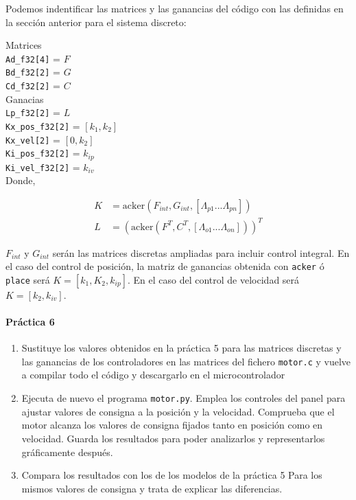 \documentclass[10pt,a4paper]{report}
\begin{document}
Podemos indentificar las matrices y las ganancias del código con las definidas en la sección anterior para el sistema discreto:

Matrices\\
\texttt{Ad\_f32[4]} = $F$\\
\texttt{Bd\_f32[2]} = $G$\\
\texttt{Cd\_f32[2]} = $C$\\

Ganacias\\
\texttt{Lp\_f32[2]} = $L$ \\
\texttt{Kx\_pos\_f32[2]} = $[k_1,k_2]$\\
\texttt{Kx\_vel[2]} = $[0,k_2]$\\
\texttt{Ki\_pos\_f32[2]} = $k_{ip}$\\
\texttt{Ki\_vel\_f32[2]} = $k_{iv}$\\

Donde,

\begin{align*}
K &= \text{acker}(F_{int},G_{int},[\Lambda_{p1}...\Lambda_{pn}])\\
L &= \left(\text{acker}(F^T,C^T,[\Lambda_{o1}...\Lambda_{on}])\right)^T
\end{align*}

$F_{int}$ y $G_{int}$ serán las matrices discretas ampliadas para incluir control integral. En el caso del control de posición, la matriz de ganancias obtenida con \texttt{acker} ó \texttt{place} será $K = [k_1,K_2,k_{ip}]$. En el caso del control de velocidad será $K = [k_2,k_{iv}]$.

\paragraph{Práctica 6}
\begin{enumerate}
\item  Sustituye los valores obtenidos en la práctica 5 para las matrices discretas y las ganancias de los controladores en las matrices del fichero \texttt{motor.c} y vuelve a compilar todo el código y descargarlo en el microcontrolador
 \item Ejecuta de nuevo el programa \texttt{motor.py}. Emplea los controles del panel para ajustar valores de consigna a la posición y la velocidad. Comprueba que el motor alcanza los valores de consigna fijados tanto en posición como en velocidad. Guarda los resultados para poder analizarlos y representarlos gráficamente después. 
 
\item Compara los resultados con los de los modelos de la práctica 5 Para los mismos valores de consigna y trata de explicar las diferencias.
\end{enumerate}
\end{document}

